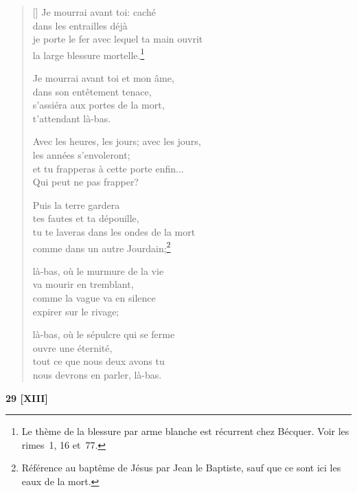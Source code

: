\documentclass[a4paper,12pt]{book}
\begin{document}
\begin{verse}[\versewidth]
  Je mourrai avant toi: caché \\
  dans les entrailles déjà \\
  je porte le fer avec lequel ta main ouvrit \\
  la large blessure mortelle.\footnote{Le thème de la blessure
  par arme blanche est récurrent chez Bécquer. Voir les rimes~1, 16 et~77.}

  Je mourrai avant toi et mon âme, \\
  dans son entêtement tenace, \\
  s'assiéra aux portes de la mort, \\
  t'attendant là-bas.

  Avec les heures, les jours; avec les jours, \\
  les années s'envoleront; \\
  et tu frapperas à cette porte enfin... \\
  Qui peut ne pas frapper?

  Puis la terre gardera \\
  tes fautes et ta dépouille, \\
  tu te laveras dans les ondes de la mort \\
  comme dans un autre Jourdain;\footnote{Référence au baptême de Jésus
  par Jean le Baptiste, sauf que ce sont ici les eaux de la mort.}

  là-bas, où le murmure de la vie \\
  va mourir en tremblant, \\
  comme la vague va en silence \\
  expirer sur le rivage;

  là-bas, où le sépulcre qui se ferme \\
  ouvre une éternité, \\
  tout ce que nous deux avons tu \\
  nous devrons en parler, là-bas.
\end{verse}

\bigskip

\begin{center}
  \textbf{29 [XIII]}
\end{center}

\settowidth{\versewidth}{comme un point de lumière irradie une idée,}
\end{document}
